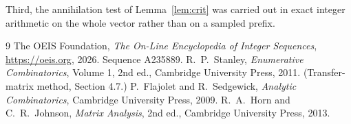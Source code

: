 \documentclass[11pt,a4paper]{article}
\theoremstyle{plain}
\theoremstyle{definition}
\begin{document}
Third, the annihilation test of Lemma~\ref{lem:crit} was carried out in exact integer
arithmetic on the whole vector rather than on a sampled prefix.

\begin{thebibliography}{9}
 The OEIS Foundation, \emph{The On-Line Encyclopedia of Integer
Sequences}, \url{https://oeis.org}, 2026. Sequence A235889.
 R.~P.~Stanley, \emph{Enumerative Combinatorics}, Volume 1, 2nd ed.,
Cambridge University Press, 2011. (Transfer-matrix method, Section 4.7.)
 P.~Flajolet and R.~Sedgewick, \emph{Analytic Combinatorics}, Cambridge
University Press, 2009.
 R.~A.~Horn and C.~R.~Johnson, \emph{Matrix Analysis}, 2nd ed., Cambridge
University Press, 2013.
\end{thebibliography}
\end{document}
